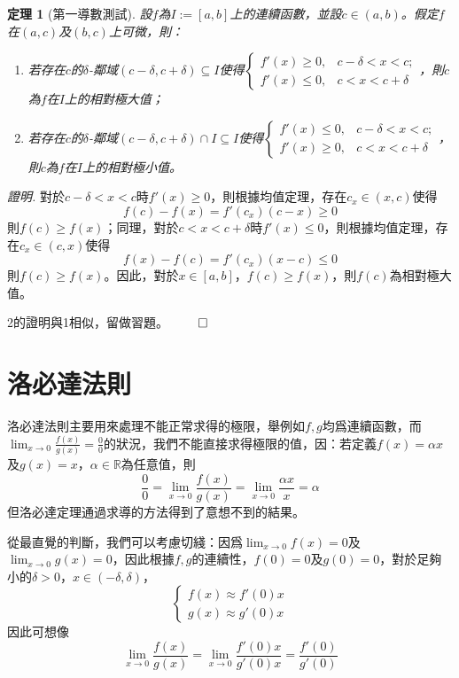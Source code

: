 \documentclass[12pt]{article}
\newtheorem*{theorem}{定理}
\renewenvironment*{proof}{\textit{證明.}}{\hfill$\qed$}
\begin{document}
    \begin{theorem}[第一導數測試]
        設$f$為$I:=[a,b]$上的連續函數，並設$c\in(a,b)$。假定$f$在$(a,c)$及$(b,c)$上可微，則：\begin{enumerate}
            \item 若存在$c$的$\delta$-鄰域$(c-\delta,c+\delta)\subseteq I$使得$\begin{cases}
                f'(x)\geq 0, &c-\delta<x<c;\\
                f'(x)\leq 0, &c<x<c+\delta
            \end{cases}$，則$c$為$f$在$I$上的相對極大值；
            \item 若存在$c$的$\delta$-鄰域$(c-\delta,c+\delta)\cap I\subseteq I$使得$\begin{cases}
                f'(x)\leq 0, &c-\delta<x<c;\\
                f'(x)\geq 0, &c<x<c+\delta
            \end{cases}$，則$c$為$f$在$I$上的相對極小值。
        \end{enumerate}
    \end{theorem}

    \begin{proof}
        對於$c-\delta<x<c$時$f'(x)\geq 0$，則根據均值定理，存在$c_x\in(x,c)$使得$$f(c)-f(x)=f'(c_x)(c-x)\geq 0$$則$f(c)\geq f(x)$；同理，對於$c<x<c+\delta$時$f'(x)\leq 0$，則根據均值定理，存在$c_x\in(c,x)$使得$$f(x)-f(c)=f'(c_x)(x-c)\leq 0$$則$f(c)\geq f(x)$。因此，對於$x\in[a,b]$，$f(c)\geq f(x)$，則$f(c)$為相對極大值。

        2的證明與1相似，留做習題。
    \end{proof}

    \section*{洛必達法則}

    洛必達法則主要用來處理不能正常求得的極限，舉例如$f,g$均爲連續函數，而$\displaystyle\lim_{x\to 0}\frac{f(x)}{g(x)}=\frac{0}{0}$的狀況，我們不能直接求得極限的值，因：若定義$f(x)=\alpha x$及$g(x)=x$，$\alpha\in\mathbb{R}$為任意值，則$$\frac{0}{0}=\lim_{x\to 0}\frac{f(x)}{g(x)}=\lim_{x\to 0}\frac{\alpha x}{x}=\alpha$$但洛必達定理通過求導的方法得到了意想不到的結果。

    從最直覺的判斷，我們可以考慮切綫：因爲$\lim_{x\to 0}f(x)=0$及$\lim_{x\to 0}g(x)=0$，因此根據$f,g$的連續性，$f(0)=0$及$g(0)=0$，對於足夠小的$\delta>0$，$x\in(-\delta,\delta)$，$$\begin{cases}
        f(x)\approx f'(0)x\\ g(x)\approx g'(0)x
    \end{cases}$$因此可想像$$\lim_{x\to 0}\frac{f(x)}{g(x)}=\lim_{x\to 0}\frac{f'(0)x}{g'(0)x}=\frac{f'(0)}{g'(0)}$$
\end{document}

